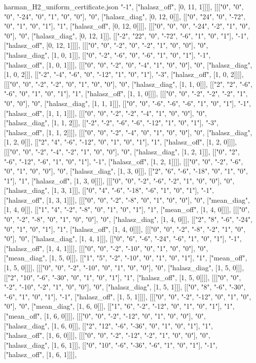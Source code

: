 \begin{filecontents*}[overwrite]{harman_H2_uniform_certificate.json}
"-1", ["halasz_off", [0, 11, 1]]]], [[["0", "0", "0", "-24", "0", "1", "0", "0"], "0", ["halasz_diag", [0, 12, 0]]], [["0", "24", "0", "-72", "0", "1", "0", "1"], "1", ["halasz_off", [0, 12, 0]]]], [[["0", "0", "0", "-24", "-2", "1", "0", "0"], "0", ["halasz_diag", [0, 12, 1]]], [["-2", "22", "0", "-72", "-6", "1", "0", "1"], "-1", ["halasz_off", [0, 12, 1]]]], [[["0", "0", "-2", "0", "-2", "1", "0", "0"], "0", ["halasz_diag", [1, 0, 1]]], [["0", "-2", "-6", "0", "-6", "1", "0", "1"], "-1", ["halasz_off", [1, 0, 1]]]], [[["0", "0", "-2", "0", "-4", "1", "0", "0"], "0", ["halasz_diag", [1, 0, 2]]], [["-2", "-4", "-6", "0", "-12", "1", "0", "1"], "-3", ["halasz_off", [1, 0, 2]]]], [[["0", "0", "-2", "-2", "0", "1", "0", "0"], "0", ["halasz_diag", [1, 1, 0]]], [["2", "2", "-6", "-6", "0", "1", "0", "1"], "1", ["halasz_off", [1, 1, 0]]]], [[["0", "0", "-2", "-2", "-2", "1", "0", "0"], "0", ["halasz_diag", [1, 1, 1]]], [["0", "0", "-6", "-6", "-6", "1", "0", "1"], "-1", ["halasz_off", [1, 1, 1]]]], [[["0", "0", "-2", "-2", "-4", "1", "0", "0"], "0", ["halasz_diag", [1, 1, 2]]], [["-2", "-2", "-6", "-6", "-12", "1", "0", "1"], "-3", ["halasz_off", [1, 1, 2]]]], [[["0", "0", "-2", "-4", "0", "1", "0", "0"], "0", ["halasz_diag", [1, 2, 0]]], [["2", "4", "-6", "-12", "0", "1", "0", "1"], "1", ["halasz_off", [1, 2, 0]]]], [[["0", "0", "-2", "-4", "-2", "1", "0", "0"], "0", ["halasz_diag", [1, 2, 1]]], [["0", "2", "-6", "-12", "-6", "1", "0", "1"], "-1", ["halasz_off", [1, 2, 1]]]], [[["0", "0", "-2", "-6", "0", "1", "0", "0"], "0", ["halasz_diag", [1, 3, 0]]], [["2", "6", "-6", "-18", "0", "1", "0", "1"], "1", ["halasz_off", [1, 3, 0]]]], [[["0", "0", "-2", "-6", "-2", "1", "0", "0"], "0", ["halasz_diag", [1, 3, 1]]], [["0", "4", "-6", "-18", "-6", "1", "0", "1"], "-1", ["halasz_off", [1, 3, 1]]]], [[["0", "0", "-2", "-8", "0", "1", "0", "0"], "0", ["mean_diag", [1, 4, 0]]], [["1", "4", "-2", "-8", "0", "1", "0", "1"], "1", ["mean_off", [1, 4, 0]]]], [[["0", "0", "-2", "-8", "0", "1", "0", "0"], "0", ["halasz_diag", [1, 4, 0]]], [["2", "8", "-6", "-24", "0", "1", "0", "1"], "1", ["halasz_off", [1, 4, 0]]]], [[["0", "0", "-2", "-8", "-2", "1", "0", "0"], "0", ["halasz_diag", [1, 4, 1]]], [["0", "6", "-6", "-24", "-6", "1", "0", "1"], "-1", ["halasz_off", [1, 4, 1]]]], [[["0", "0", "-2", "-10", "0", "1", "0", "0"], "0", ["mean_diag", [1, 5, 0]]], [["1", "5", "-2", "-10", "0", "1", "0", "1"], "1", ["mean_off", [1, 5, 0]]]], [[["0", "0", "-2", "-10", "0", "1", "0", "0"], "0", ["halasz_diag", [1, 5, 0]]], [["2", "10", "-6", "-30", "0", "1", "0", "1"], "1", ["halasz_off", [1, 5, 0]]]], [[["0", "0", "-2", "-10", "-2", "1", "0", "0"], "0", ["halasz_diag", [1, 5, 1]]], [["0", "8", "-6", "-30", "-6", "1", "0", "1"], "-1", ["halasz_off", [1, 5, 1]]]], [[["0", "0", "-2", "-12", "0", "1", "0", "0"], "0", ["mean_diag", [1, 6, 0]]], [["1", "6", "-2", "-12", "0", "1", "0", "1"], "1", ["mean_off", [1, 6, 0]]]], [[["0", "0", "-2", "-12", "0", "1", "0", "0"], "0", ["halasz_diag", [1, 6, 0]]], [["2", "12", "-6", "-36", "0", "1", "0", "1"], "1", ["halasz_off", [1, 6, 0]]]], [[["0", "0", "-2", "-12", "-2", "1", "0", "0"], "0", ["halasz_diag", [1, 6, 1]]], [["0", "10", "-6", "-36", "-6", "1", "0", "1"], "-1", ["halasz_off", [1, 6, 1]]]], 
\end{filecontents*}
